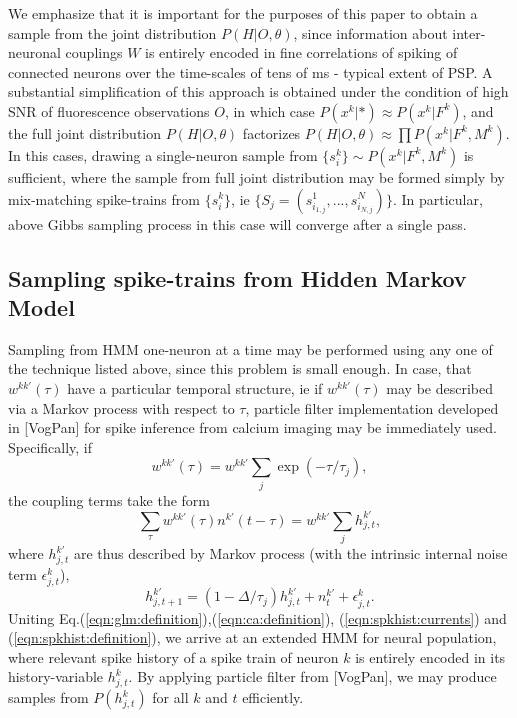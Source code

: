 \documentclass[amsmath,amssymb]{revtex4}
\begin{document}
We emphasize that it is important for the purposes of this paper to obtain a sample from the joint distribution $P(H|O,\theta)$, since information about inter-neuronal couplings $W$ is entirely encoded in fine correlations of spiking of connected neurons over the time-scales of tens of ms - typical extent of PSP. A substantial simplification of this approach is obtained under the condition of high SNR of fluorescence observations $O$, in which case $P(x^k|*)\approx P(x^k|F^k)$, and the full joint distribution $P(H|O,\theta)$ factorizes $P(H|O,\theta)\approx\prod P(x^k|F^k,M^k)$. In this cases, drawing a single-neuron sample from $\{s^k_i\}\sim P(x^k|F^k,M^k)$ is sufficient, where the sample from full joint distribution may be formed simply by mix-matching spike-trains from $\{s^k_i\}$, ie
$\{S_j=(s^1_{i_{1,j}},...,s^N_{i_{N,j}})\}$. In particular, above Gibbs sampling process in this case will converge after a single pass.

\subsection{\label{sec:methods:sampling HMM}Sampling spike-trains from Hidden Markov Model}
Sampling from HMM one-neuron at a time may be performed using any one of the technique listed above, since this problem is small enough. In case, that $w^{kk'}(\tau)$ have a particular temporal structure, ie if $w^{kk'}(\tau)$ may be described via a Markov process with respect to $\tau$, particle filter implementation developed in [VogPan] for spike inference from calcium imaging may be immediately used. Specifically, if
\begin{equation}
w^{kk'}(\tau)=w^{kk'} \sum_j \exp(-\tau/\tau_j),
\end{equation}
the coupling terms take the form
\begin{equation}\label{eqn:spkhist:currents}
\sum_\tau w^{kk'}(\tau)n^{k'}(t-\tau) = w^{kk'} \sum_j h^{k'}_{j,t},
\end{equation}
where $h^{k'}_{j,t}$ are thus described by Markov process (with the intrinsic internal noise term $\epsilon^k_{j,t}$),
\begin{equation}\label{eqn:spkhist:definition}
h^{k'}_{j,t+1}=(1-\Delta/\tau_j) h^{k'}_{j,t} + n^{k'}_t + \epsilon^{k}_{j,t}.
\end{equation}
Uniting Eq.(\ref{eqn:glm:definition}),(\ref{eqn:ca:definition}), (\ref{eqn:spkhist:currents}) and (\ref{eqn:spkhist:definition}), we arrive at an extended HMM for neural population, where relevant spike history of a spike train of neuron $k$ is entirely encoded in its history-variable $h^{k}_{j,t}$. By applying particle filter from [VogPan], we may produce samples from $P(h^{k}_{j,t})$ for all $k$ and $t$ efficiently.
\end{document}
